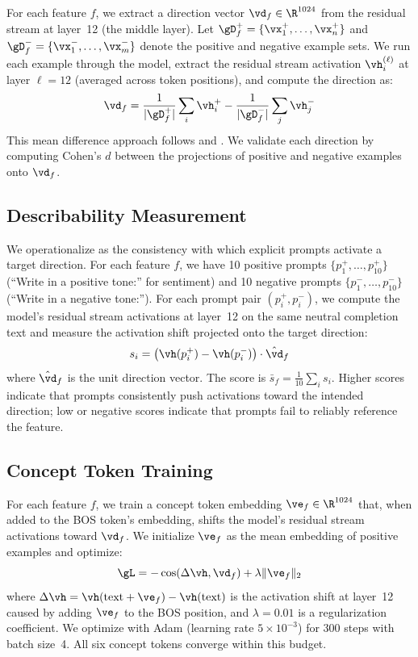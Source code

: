 For each feature $f$, we extract a direction vector $\vd_f \in \R^{1024}$ from the residual stream at layer~12 (the middle layer). Let $\gD_f^+ = \{\vx_1^+, \ldots, \vx_n^+\}$ and $\gD_f^- = \{\vx_1^-, \ldots, \vx_m^-\}$ denote the positive and negative example sets. We run each example through the model, extract the residual stream activation $\vh_i^{(\ell)}$ at layer $\ell = 12$ (averaged across token positions), and compute the direction as:
\begin{equation}
    \vd_f = \frac{1}{|\gD_f^+|} \sum_{i} \vh_i^{+} - \frac{1}{|\gD_f^-|} \sum_{j} \vh_j^{-}
    \label{eq:direction}
\end{equation}
This mean difference approach follows \citet{turner2023steering} and \citet{rimsky2023steering}. We validate each direction by computing Cohen's $d$ between the projections of positive and negative examples onto $\vd_f$.

\subsection{Describability Measurement}
\label{sec:describability}

We operationalize \describability as the consistency with which explicit prompts activate a target direction. For each feature $f$, we have 10 positive prompts $\{p_1^+, \ldots, p_{10}^+\}$ (\eg ``Write in a positive tone:'' for sentiment) and 10 negative prompts $\{p_1^-, \ldots, p_{10}^-\}$ (\eg ``Write in a negative tone:''). For each prompt pair $(p_i^+, p_i^-)$, we compute the model's residual stream activations at layer~12 on the same neutral completion text and measure the activation shift projected onto the target direction:
\begin{equation}
    s_i = \left(\vh(p_i^+) - \vh(p_i^-)\right) \cdot \hat{\vd}_f
    \label{eq:describability}
\end{equation}
where $\hat{\vd}_f$ is the unit direction vector. The \describability score is $\bar{s}_f = \frac{1}{10}\sum_i s_i$. Higher scores indicate that prompts consistently push activations toward the intended direction; low or negative scores indicate that prompts fail to reliably reference the feature.

\subsection{Concept Token Training}
\label{sec:ct_training}

For each feature $f$, we train a concept token embedding $\ve_f \in \R^{1024}$ that, when added to the BOS token's embedding, shifts the model's residual stream activations toward $\vd_f$. We initialize $\ve_f$ as the mean embedding of positive examples and optimize:
\begin{equation}
    \gL = -\cos(\Delta \vh, \vd_f) + \lambda \|\ve_f\|_2
    \label{eq:ct_loss}
\end{equation}
where $\Delta \vh = \vh(\text{text} + \ve_f) - \vh(\text{text})$ is the activation shift at layer~12 caused by adding $\ve_f$ to the BOS position, and $\lambda = 0.01$ is a regularization coefficient. We optimize with Adam (learning rate $5 \times 10^{-3}$) for 300 steps with batch size~4. All six concept tokens converge within this budget.

